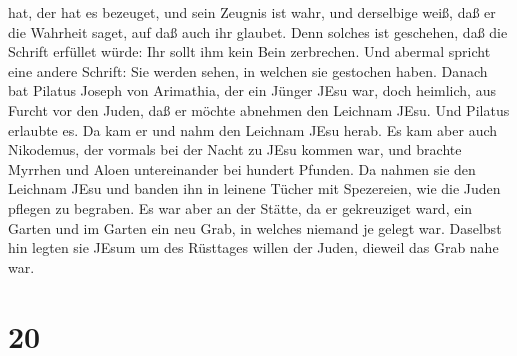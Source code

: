 hat, der hat es bezeuget, und sein Zeugnis ist wahr, und derselbige
weiß, daß er die Wahrheit saget, auf daß auch ihr glaubet. 
Denn solches ist geschehen, daß die Schrift erfüllet würde: Ihr sollt
ihm kein Bein zerbrechen.  Und abermal spricht eine andere
Schrift: Sie werden sehen, in welchen sie gestochen haben. 
Danach bat Pilatus Joseph von Arimathia, der ein Jünger JEsu war, doch
heimlich, aus Furcht vor den Juden, daß er möchte abnehmen den Leichnam
JEsu. Und Pilatus erlaubte es. Da kam er und nahm den Leichnam JEsu
herab.  Es kam aber auch Nikodemus, der vormals bei der
Nacht zu JEsu kommen war, und brachte Myrrhen und Aloen untereinander
bei hundert Pfunden.  Da nahmen sie den Leichnam JEsu und
banden ihn in leinene Tücher mit Spezereien, wie die Juden pflegen zu
begraben.  Es war aber an der Stätte, da er gekreuziget
ward, ein Garten und im Garten ein neu Grab, in welches niemand je
gelegt war.  Daselbst hin legten sie JEsum um des Rüsttages
willen der Juden, dieweil das Grab nahe war.

\hypertarget{section-19}{%
\section{20}\label{section-19}}

